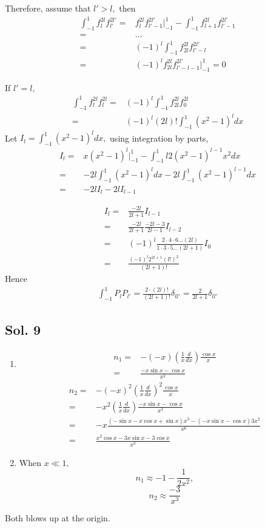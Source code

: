 Therefore, assume that $l'> l,$ then 
\begin{align*}
    \int_{-1}^1
    f_l^{2l}f_{l'}^{2l'} = &
    f^{2l}_lf^{2l'}_{l'-1}\bigg|^1_{-1}
    -\int_{-1}^1
    f^{2l}_{l+1}f^{2l'}_{l'-1}\\
    =&\dots\\
    =&(-1)^{l}
    \int_{-1}^1f^{2l}_{2l}
    f^{2l'}_{l'-l} \\
    =& (-1)^l
    f^{2l}_{2l}
    f^{2l'}_{l'-l-1}\bigg|^1_{-1}=0
\end{align*}

If $l'=l,$
\begin{align*}
    \int_{-1}^1
    f_l^{2l}f_{l}^{2l}
     =&(-1)^{l}
    \int_{-1}^1f^{2l}_{2l}
    f^{2l}_{0} \\
    =&(-1)^l(2l)!
    \int_{-1}^1(x^2-1)^ldx
\end{align*}
Let $I_l = \int_{-1}^1(x^2-1)^ldx,$ using integration by parts,
\begin{align*}
    I_l =& x(x^2-1)^l\bigg|^{1}_{-1}-
    \int_{-1}^1l2(x^2-1)^{l-1}x^2dx
    \\
=&-2l\int_{-1}^1(x^2-1)^ldx - 2l
\int_{-1}^1(x^2-1)^{l-1}dx\\
=&-2lI_l-2lI_{l-1}
\end{align*}

\begin{align*}
     I_l=&\frac{-2l}{2l+1}I_{l-1}\\
     =&
     \frac{-2l}{2l+1}\frac{-2l-3}{2l-1}I_{l-2}\\
     =&(-1)^l\frac{2\cdot 4\cdot 6 \dots (2l)}{1\cdot 3\cdot 5\dots (2l+1)}I_0\\
     =&\frac{(-1)^l2^{2l+1}(l!)^2}{(2l+1)!}
\end{align*}
Hence 
\begin{align*}
    \int_{-1}^1P_lP_{l'}
    =\frac{2\cdot(2l)!}{(2l+1)!}\delta_{ll'}
    =\frac{2}{2l+1}\delta_{ll'}
\end{align*}

\subsection*{Sol. 9}
\begin{enumerate}
    \item 
    \begin{align*}
    n_1=&
    -(-x)\left(\frac{1}{x}\frac{d}{dx}\right)\frac{\cos x}{x}\\
    =&
    \frac{-x\sin x-\cos x}{x^2}
\end{align*}
\begin{align*}
    n_2=&
    -(-x)^2\left(\frac{1}{x}\frac{d}{dx}\right)^2\frac{\cos x}{x}\\
    =&
    -x^2
    \left(\frac{1}{x}\frac{d}{dx}\right)
    \frac{-x\sin x-\cos x}{x^3}\\
    =&-x\frac{(-\sin x-x\cos x+\sin x)x^3 - (-x\sin x-\cos x)3x^2}{x^6}\\
    =&\frac{x^2\cos x  - 3x\sin x - 3\cos x}{x^3}
\end{align*}
\item 
When $x\ll 1,$ 
$$
n_1 \approx -1-\frac{1}{2x^2},
$$
$$
n_2 \approx \frac{-3}{x^3}
$$
\end{enumerate}
Both blows up at the origin.


